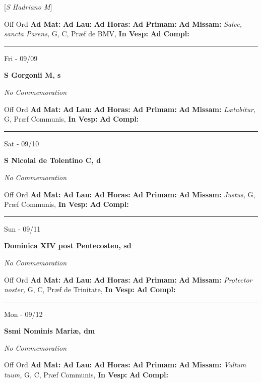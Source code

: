 \documentclass[letterpaper, 10pt]{article}
\begin{document}
[\textit{S Hadriano M}]
\begin{justify}
Off Ord
\textbf{Ad Mat: }
\textbf{Ad Lau: }
\textbf{Ad Horas: }
\textbf{Ad Primam: }
\textbf{Ad Missam:} \textit{Salve, sancta Parens, } G, C, Præf de BMV, 
\textbf{In Vesp: }
\textbf{Ad Compl: }\end{justify}



\hrule
\begin{center}
Fri - 09/09
\end{center}\textbf{ \large S Gorgonii M, \textnormal{\normalsize s}}

\textit{No Commemoration}\begin{justify}
Off Ord
\textbf{Ad Mat: }
\textbf{Ad Lau: }
\textbf{Ad Horas: }
\textbf{Ad Primam: }
\textbf{Ad Missam:} \textit{Lætabitur, } G, Præf Communis, 
\textbf{In Vesp: }
\textbf{Ad Compl: }\end{justify}



\hrule
\begin{center}
Sat - 09/10
\end{center}\textbf{ \large S Nicolai de Tolentino C, \textnormal{\normalsize d}}

\textit{No Commemoration}\begin{justify}
Off Ord
\textbf{Ad Mat: }
\textbf{Ad Lau: }
\textbf{Ad Horas: }
\textbf{Ad Primam: }
\textbf{Ad Missam:} \textit{Justus, } G, Præf Communis, 
\textbf{In Vesp: }
\textbf{Ad Compl: }\end{justify}



\hrule
\begin{center}
Sun - 09/11
\end{center}\textbf{ \large Dominica XIV post Pentecosten, \textnormal{\normalsize sd}}

\textit{No Commemoration}\begin{justify}
Off Ord
\textbf{Ad Mat: }
\textbf{Ad Lau: }
\textbf{Ad Horas: }
\textbf{Ad Primam: }
\textbf{Ad Missam:} \textit{Protector noster, } G, C, Præf de Trinitate, 
\textbf{In Vesp: }
\textbf{Ad Compl: }\end{justify}



\hrule
\begin{center}
Mon - 09/12
\end{center}\textbf{ \large Ssmi Nominis Mariæ, \textnormal{\normalsize dm}}

\textit{No Commemoration}\begin{justify}
Off Ord
\textbf{Ad Mat: }
\textbf{Ad Lau: }
\textbf{Ad Horas: }
\textbf{Ad Primam: }
\textbf{Ad Missam:} \textit{Vultum tuum, } G, C, Præf Communis, 
\textbf{In Vesp: }
\textbf{Ad Compl: }\end{justify}
\end{document}
